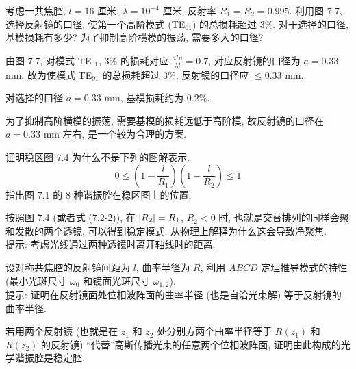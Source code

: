 \documentclass{note}
\begin{document}
\begin{exe}
    考虑一共焦腔, $l=16$ 厘米, $\lambda=10^{-4}$ 厘米, 反射率 $R_1=R_2=0.995$. 利用图 7.7, 选择反射镜的口径, 使第一个高阶模式 (TE$_{01}$) 的总损耗超过 $3\%$. 对于选择的口径, 基模损耗有多少? 为了抑制高阶横模的振荡, 需要多大的口径?
\end{exe}
\begin{sol}
    由图 7.7, 对模式 TE$_{01}$, $3\%$ 的损耗对应 $\frac{a^2n}{\lambda l}=0.7$, 对应反射镜的口径为 $a=0.33$ mm, 故为使模式 TE$_{01}$ 的总损耗超过 $3\%$, 反射镜的口径应 $\leq 0.33$ mm.

    对选择的口径 $a=0.33$ mm, 基模损耗约为 $0.2\%$.

    为了抑制高阶横模的振荡, 需要基模的损耗远低于高阶模, 故反射镜的口径在 $a=0.33$ mm 左右, 是一个较为合理的方案.
\end{sol}

\begin{exe}
    证明稳区图 7.4 为什么不是下列的图解表示.
    \[
        0\leq\left(1-\frac{l}{R_1}\right)\left(1-\frac{l}{R_2}\right)\leq 1
    \]
    指出图 7.1 的 8 种谐振腔在稳区图上的位置.
\end{exe}
\begin{sol}
    
\end{sol}

\begin{exe}
    按照图 7.4 (或者式 (7.2-2)), 在 $\left\lvert R_2\right\rvert=R_1$, $R_2<0$ 时, 也就是交替排列的同样会聚和发散的两个透镜, 可以得到稳定模式. 从物理上解释为什么这会导致净聚焦.\\
    提示: 考虑光线通过两种透镜时离开轴线时的距离.
\end{exe}
\begin{sol}
    
\end{sol}

\begin{exe}
    设对称共焦腔的反射镜间距为 $l$, 曲率半径为 $R$, 利用 $ABCD$ 定理推导模式的特性 (最小光斑尺寸 $\omega_0$ 和镜面光斑尺寸 $\omega_{1,2}$).\\
    提示: 证明在反射镜面处位相波阵面的曲率半径 (也是自洽光束解) 等于反射镜的曲率半径.
\end{exe}
\begin{sol}
    
\end{sol}

\begin{exe}
    若用两个反射镜 (也就是在 $z_1$ 和 $z_2$ 处分别方两个曲率半径等于 $R(z_1)$ 和 $R(z_2)$ 的反射镜) ``代替''高斯传播光束的任意两个位相波阵面, 证明由此构成的光学谐振腔是稳定腔.
\end{exe}
\begin{pf}
    
\end{pf}
\end{document}
